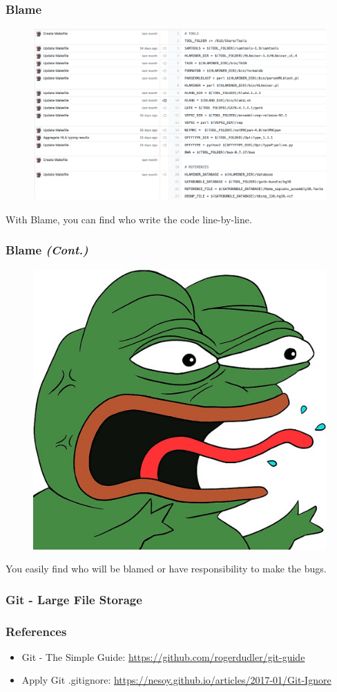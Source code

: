 \documentclass[aspectratio=169]{beamer}
\begin{document}
	\begin{frame}
		\frametitle{Blame}
		
		\begin{figure}
			\centering
			\includegraphics[width=0.5 \linewidth]{figures/blame.png}
		\end{figure}
	
		With Blame, you can find who write the code line-by-line.
	\end{frame}

	\begin{frame}
		\frametitle{Blame \textit{(Cont.)}}
		
		\begin{figure}
			\centering
			\includegraphics[width=0.3 \linewidth]{figures/blame.jpg}
		\end{figure}
	
		You easily find who will be blamed or have responsibility to make the bugs. 
	\end{frame}

	\begin{frame}
		\frametitle{Git - Large File Storage}
	\end{frame}

	\begin{frame}
		\frametitle{References}
		
		\begin{itemize}
			\item Git - The Simple Guide: \url{https://github.com/rogerdudler/git-guide}
			\item Apply Git .gitignore: \url{https://nesoy.github.io/articles/2017-01/Git-Ignore}
		\end{itemize}
	\end{frame}
\end{document}
